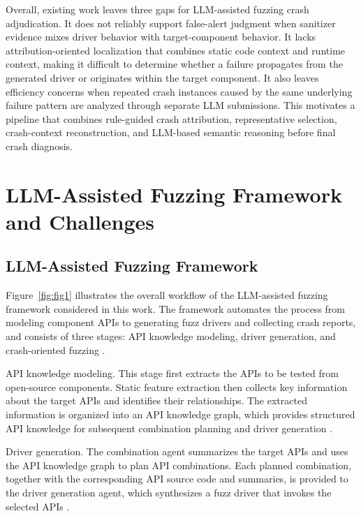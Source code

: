\documentclass[pdflatex,sn-basic]{sn-jnl}%
\theoremstyle{thmstyleone}%
\theoremstyle{thmstyletwo}%
\theoremstyle{thmstylethree}%
\begin{document}
Overall, existing work leaves three gaps for LLM-assisted fuzzing crash adjudication. It does not reliably support false-alert judgment when sanitizer evidence mixes driver behavior with target-component behavior. It lacks attribution-oriented localization that combines static code context and runtime context, making it difficult to determine whether a failure propagates from the generated driver or originates within the target component. It also leaves efficiency concerns when repeated crash instances caused by the same underlying failure pattern are analyzed through separate LLM submissions. This motivates a pipeline that combines rule-guided crash attribution, representative selection, crash-context reconstruction, and LLM-based semantic reasoning before final crash diagnosis.



\section{LLM-Assisted Fuzzing Framework and Challenges}
\label{sec:preliminaries}

\subsection{LLM-Assisted Fuzzing Framework}

Figure~\ref{fig:fig1} illustrates the overall workflow of the LLM-assisted fuzzing framework considered in this work. The framework automates the process from modeling component APIs to generating fuzz drivers and collecting crash reports, and consists of three stages: API knowledge modeling, driver generation, and crash-oriented fuzzing \citep{ref12}.

API knowledge modeling. This stage first extracts the APIs to be tested from open-source components. Static feature extraction then collects key information about the target APIs and identifies their relationships. The extracted information is organized into an API knowledge graph, which provides structured API knowledge for subsequent combination planning and driver generation \citep{ref12}.

Driver generation. The combination agent summarizes the target APIs and uses the API knowledge graph to plan API combinations. Each planned combination, together with the corresponding API source code and summaries, is provided to the driver generation agent, which synthesizes a fuzz driver that invokes the selected APIs \citep{ref8,ref12,ref13}.
\end{document}
